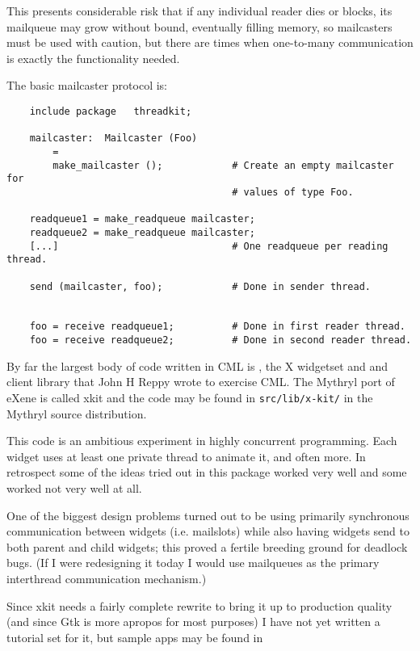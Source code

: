 \begin{itemize}
\begin{itemize}
This presents considerable risk that if any individual 
reader dies or blocks, its mailqueue may grow without 
bound, eventually filling memory, so mailcasters must 
be used with caution, but there are times when one-to-many 
communication is exactly the functionality needed. 

The basic mailcaster protocol is: 

\begin{verbatim}
    include package   threadkit;

    mailcaster:  Mailcaster (Foo)
        =
        make_mailcaster ();            # Create an empty mailcaster for
                                       # values of type Foo.

    readqueue1 = make_readqueue mailcaster;
    readqueue2 = make_readqueue mailcaster;
    [...]                              # One readqueue per reading thread.

    send (mailcaster, foo);            # Done in sender thread.


    foo = receive readqueue1;          # Done in first reader thread.
    foo = receive readqueue2;          # Done in second reader thread.
\end{verbatim}

\end{itemize}
\end{itemize}


By far the largest body of code written in CML is , 
the X widgetset and and client library that John H Reppy wrote to exercise CML.
The Mythryl port of eXene is called xkit and the code may be found in {\tt src/lib/x-kit/} 
in the Mythryl source distribution.

This code is an ambitious experiment in highly concurrent programming.  Each widget uses 
at least one private thread to animate it, and often more.  In retrospect some of the 
ideas tried out in this package worked very well and some worked not very well at all. 

One of the biggest design problems turned out to be using primarily synchronous communication 
between widgets (i.e. mailslots) while also having widgets send to both parent and child 
widgets;  this proved a fertile breeding ground for deadlock bugs.  (If I were redesigning 
it today I would use mailqueues as the primary interthread communication mechanism.) 

Since xkit needs a fairly complete rewrite to bring it up to production quality 
(and since Gtk is more apropos for most purposes) I have not yet written a tutorial 
set for it, but sample apps may be found in 

